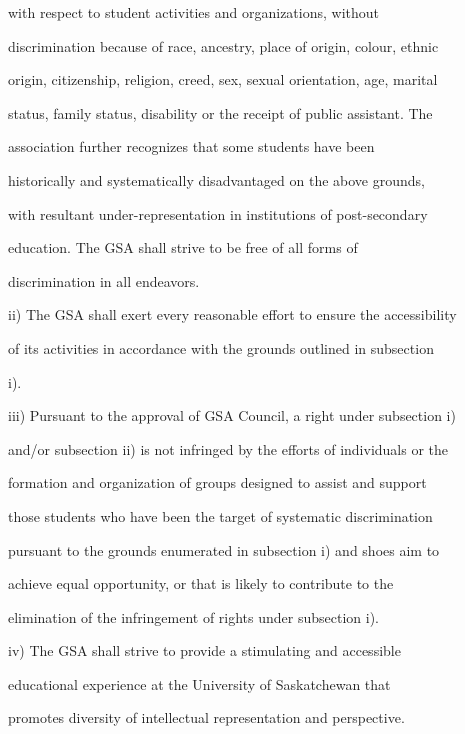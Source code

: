 \documentclass{article}
\begin{document}
with     respect     to    student     activities     and     organizations,       without  

discrimination because of race, ancestry, place of origin, colour, ethnic  

origin, citizenship, religion, creed, sex, sexual orientation, age, marital  

status,  family  status,  disability  or  the  receipt  of  public  assistant.  The  

association       further     recognizes       that   some      students      have     been  

historically  and  systematically  disadvantaged  on  the  above  grounds,  

with  resultant  under-representation  in  institutions  of  post-secondary  

education.      The     GSA      shall    strive   to   be    free   of    all  forms     of  

discrimination in all endeavors.  



ii)     The GSA shall exert every reasonable effort to ensure the accessibility  

of its activities in accordance with the grounds outlined in subsection  

i).  



iii)    Pursuant to the approval of GSA Council, a right under subsection i)  

and/or subsection ii) is not infringed by the efforts of individuals or the  

formation  and  organization  of  groups  designed  to  assist  and  support  

those students who have been the target of systematic discrimination  

pursuant to the grounds enumerated in subsection i) and shoes aim to  

achieve  equal  opportunity,  or  that  is  likely  to  contribute  to  the  

elimination of the infringement of rights under subsection i).  



iv)     The   GSA   shall   strive   to   provide   a   stimulating   and   accessible  

educational       experience       at  the    University      of   Saskatchewan that  

promotes diversity of intellectual representation and perspective.  
\end{document}
